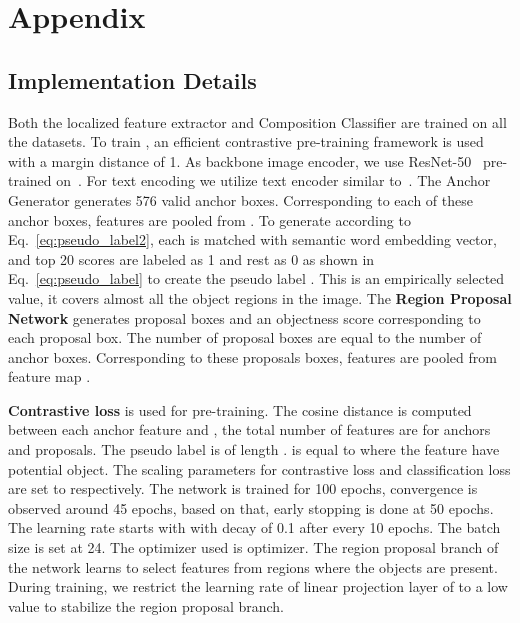 \documentclass{bmvc2k}
\begin{document}


\section{Appendix}

\subsection{Implementation Details}

Both the localized feature extractor  and Composition Classifier  are trained on all the datasets. To train , an efficient contrastive pre-training framework is used with a margin distance of 1. As backbone image encoder, we use ResNet-50~\cite{he2016deep} pre-trained on~\cite{radford2021learning}. For text encoding we utilize text encoder similar to~\cite{radford2021learning}. The Anchor Generator generates 576 valid anchor boxes. Corresponding to each of these anchor boxes, features  are pooled from . To generate  according to Eq.~\ref{eq:pseudo_label2}, each  is matched with semantic word embedding vector, and top 20 scores are labeled as 1 and rest as 0 as shown in Eq.~\ref{eq:pseudo_label} to create the pseudo label . This is an empirically selected value, it covers almost all the object regions in the image. The \textbf{Region Proposal Network} generates proposal boxes and an objectness score corresponding to each proposal box. The number of proposal boxes are equal to the number of anchor boxes. Corresponding to these proposals boxes, features  are pooled from feature map .

\textbf{Contrastive loss} is used for pre-training. The cosine distance  is computed between each anchor feature  and , the total number of features are  for anchors and  proposals. The pseudo label  is of length .  is equal to  where the  feature have potential object.
The scaling parameters for contrastive loss  and classification loss  are set to  respectively. The network is trained for 100 epochs, convergence is observed around 45 epochs, based on that, early stopping is done at 50 epochs. The learning rate starts with  with decay of 0.1 after every 10 epochs. The batch size is set at 24. The optimizer used is  optimizer. The region proposal branch of the network learns to select features from regions where the objects are present. During training, we restrict the learning rate of linear projection layer of  to a low value to stabilize the region proposal branch.
\end{document}
